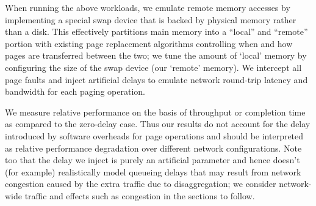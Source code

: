 When running the above workloads, we emulate remote memory accesses by implementing a special swap device that is backed by physical memory rather than a disk. This effectively partitions main memory into a ``local'' and ``remote'' portion 
with existing page replacement algorithms controlling when and how pages are transferred between the two; we tune the amount of `local' memory by configuring the size of the swap device (our `remote' memory).
We intercept all page faults and inject artificial delays to emulate network round-trip latency and bandwidth for each paging operation. 

We measure relative performance on the basis of throughput or completion time as compared to the zero-delay case. Thus our results do not account for the delay introduced by  software overheads for page operations 
and should be interpreted as relative performance degradation over different network configurations. %
Note too that the delay we inject is purely an artificial parameter and hence doesn't (for example) realistically model queueing delays that may result from network congestion caused by the extra traffic due to disaggregation; we consider network-wide traffic and effects such as congestion in the sections to follow.







